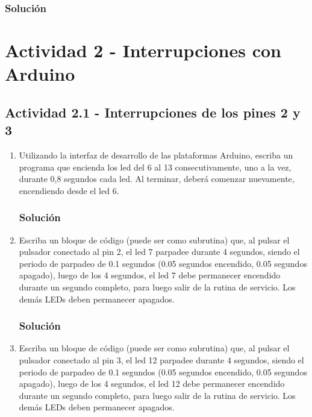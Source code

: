 \documentclass{article}
\begin{document}
\subsubsection*{Solución}


\pagebreak
\section*{Actividad 2 - Interrupciones con Arduino}
\subsection*{Actividad 2.1 - Interrupciones de los pines 2 y 3}

\begin{enumerate}[leftmargin=0pt,itemsep=10pt]
\item Utilizando la interfaz de desarrollo de las plataformas Arduino, escriba un programa que encienda los led del 6 al 13 consecutivamente, uno a la vez, durante 0,8 segundos cada led. Al terminar, deberá comenzar nuevamente, encendiendo desde el led 6.

\subsubsection*{Solución}


\pagebreak
\item Escriba un bloque de código (puede ser como subrutina) que, al pulsar el pulsador conectado al pin 2, el led 7 parpadee durante 4 segundos, siendo el periodo de parpadeo de 0.1 segundos (0.05 segundos encendido, 0.05 segundos apagado), luego de los 4 segundos, el led 7 debe permanecer encendido durante un segundo completo, para luego salir de la rutina de servicio. Los demás LEDs deben permanecer apagados.

\subsubsection*{Solución}


\pagebreak
\item Escriba un bloque de código (puede ser como subrutina) que, al pulsar el pulsador conectado al pin 3, el led 12 parpadee durante 4 segundos, siendo el periodo de parpadeo de 0.1 segundos (0.05 segundos encendido, 0.05 segundos apagado), luego de los 4 segundos, el led 12 debe permanecer encendido durante un segundo completo, para luego salir de la rutina de servicio. Los demás LEDs deben permanecer apagados.


\end{enumerate}
\end{document}
